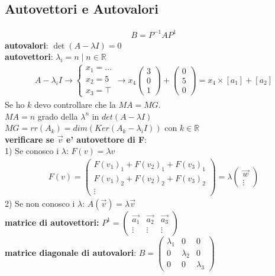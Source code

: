 \documentclass{article}
\begin{document}
\subsection*{Autovettori e Autovalori}
\begin{align}
    B=P^{-1}AP^1
\end{align}
\textbf{autovalori}: $\det(A-\lambda I)=0$ \\
\textbf{autovettori}: $\lambda_i=n \mid n\in \mathbb{R}$
\begin{align}
    A-\lambda_i I \to \begin{cases}
        x_1=\dots \\
        x_2=5 \\
        x_3 = \top 
    \end{cases}\to x_4\begin{pmatrix}
        3 \\ 0 \\1
    \end{pmatrix}+\begin{pmatrix}
        0\\5\\0
    \end{pmatrix}=x_4\times [a_1]+ [a_2]
\end{align}
Se ho $k$ devo controllare che la $MA=MG$. \\
$MA=n$ grado della $\lambda^n$ in $det(A-\lambda I)$ \\
$MG=rr(A_k)=dim(Ker(A_k-\lambda_i I))$ con $k \in \mathbb{R}$\\
\textbf{verificare se $\vec{v}$ e' autovettore di F}: \\
1) Se conosco i $\lambda$: $F(v)=\lambda v$ \\
\begin{align}
    F(v)=\begin{pmatrix}
        F(v_1)_1+F(v_2)_1+F(v_3)_1\\
        F(v_1)_2+F(v_2)_2+F(v_3)_2\\
        \vdots
    \end{pmatrix}=\lambda\begin{pmatrix}
        \vec{w} \\ \vdots
    \end{pmatrix}
\end{align}
2) Se non conosco i $\lambda$: $A(\vec{v})=\lambda \vec{v}$ \\
\textbf{matrice di autovettori:} $P^1=\begin{pmatrix}
    \vec{a_1} & \vec{a_2} & \vec{a_3} \\
    \vdots & \vdots & \vdots 
\end{pmatrix}$ \\
\textbf{matrice diagonale di autovalori}: $B=\begin{pmatrix}
    \lambda_1 & 0 & 0 \\
    0 & \lambda_2 & 0 \\
    0&0& \lambda_3
\end{pmatrix}$
\end{document}

